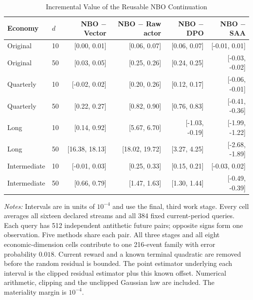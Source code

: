 \begin{table}[!htbp]
\centering\footnotesize
\caption{Incremental Value of the Reusable NBO Continuation}\label{tab:r16menucomparisons}
\begin{tabular}{llrrrr}
\toprule
Economy & $d$ & NBO $-$ Vector & NBO $-$ Raw actor & NBO $-$ DPO & NBO $-$ SAA \\
\midrule
Original & 10 & [0.00, 0.01] & [0.06, 0.07] & [0.06, 0.07] & [-0.01, 0.01] \\
Original & 50 & [0.03, 0.05] & [0.25, 0.26] & [0.24, 0.25] & [-0.03, -0.02] \\
Quarterly & 10 & [-0.02, 0.02] & [0.20, 0.26] & [0.12, 0.17] & [-0.06, -0.01] \\
Quarterly & 50 & [0.22, 0.27] & [0.82, 0.90] & [0.76, 0.83] & [-0.41, -0.36] \\
Long & 10 & [0.14, 0.92] & [5.67, 6.70] & [-1.03, -0.19] & [-1.99, -1.22] \\
Long & 50 & [16.38, 18.13] & [18.02, 19.72] & [3.27, 4.25] & [-2.68, -1.89] \\
Intermediate & 10 & [-0.01, 0.03] & [0.25, 0.33] & [0.15, 0.21] & [-0.03, 0.02] \\
Intermediate & 50 & [0.66, 0.79] & [1.47, 1.63] & [1.30, 1.44] & [-0.49, -0.39] \\
\bottomrule
\end{tabular}
\begin{minipage}{0.97\linewidth}\footnotesize\emph{Notes:} Intervals are in units of $10^{-4}$ and use the final, third work stage. Every cell averages all sixteen declared streams and all 384 fixed current-period queries. Each query has 512 independent antithetic future pairs; opposite signs form one observation. Five methods share each pair. All three stages and all eight economic-dimension cells contribute to one 216-event family with error probability $0.018$. Current reward and a known terminal quadratic are removed before the random residual is bounded. The point estimator underlying each interval is the clipped residual estimator plus this known offset. Numerical arithmetic, clipping and the unclipped Gaussian law are included. The materiality margin is $10^{-4}$.
\end{minipage}
\end{table}
